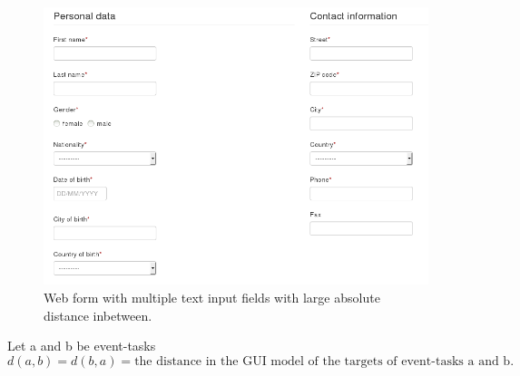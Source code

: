 \begin{figure}[h]
	\includegraphics[width=\textwidth]{chapters/approach/form.png}
	\caption{Web form with multiple text input fields with large absolute distance inbetween.}
	\label{fig:webformlargedistance}
\end{figure}
\begin{definition}
	\item Let a and b be event-tasks
\begin{equation*}d(a,b) = d(b,a) = \text{the distance in the GUI model of the targets of event-tasks a and b.}
\end{equation*}
\label{def:guimodeldistanceee}
\end{definition}

